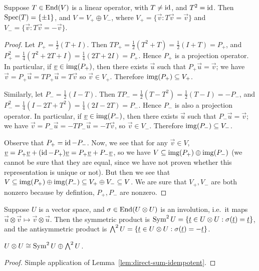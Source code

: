 \begin{lemma}\label{lem:direct-sum-idempotent}
    Suppose \(T \in \operatorname{End}(V)\) is a linear operator,
    with \(T \neq \operatorname{id}\), and \(T^2 = \operatorname{id}\).
    Then \(\operatorname{Spec}(T) = \{\pm 1\}\), and \(V = V_+ \oplus V_-\),
    where \(V_+ = \{\vec{v}: T\vec{v} = \vec{v}\}\)
    and \(V_- = \{\vec{v}: T\vec{v} = -\vec{v}\}\).
\end{lemma}
\begin{proof}
    Let \(P_+ = \frac{1}{2}(T+I)\).
    Then \(TP_+ = \frac{1}{2}(T^2+T) = \frac{1}{2}(I+T) = P_+\),
    and \(P_+^2 = \frac{1}{4}(T^2+2T+I) = \frac{1}{4}(2T+2I) = P_+\).
    Hence \(P_+\) is a projection operator.
    In particular, if \(\underline{v} \in \operatorname{img}(P_+)\),
    then there exists \(\vec{u}\) such that \(P_+\vec{u} = \vec{v}\);
    we have \(\vec{v} = P_+\vec{u} = TP_+\vec{u} = T\vec{v}\)
    so \(\vec{v} \in V_+\).
    Therefore \(\operatorname{img}(P_+) \subseteq V_+\).

    Similarly, let \(P_- = \frac{1}{2}(I-T)\).
    Then \(TP_- = \frac{1}{2}(T-T^2) = \frac{1}{2}(T-I) = -P_-\),
    and \(P_-^2 = \frac{1}{4}(I-2T+T^2) = \frac{1}{4}(2I-2T) = P_-\).
    Hence \(P_-\) is also a projection operator.
    In particular, if \(\underline{v} \in \operatorname{img}(P_-)\),
    then there exists \(\vec{u}\) such that \(P_-\vec{u} = \vec{v}\);
    we have \(\vec{v} = P_-\vec{u} = -TP_-\vec{u} = -T\vec{v}\),
    so \(\vec{v} \in V_-\).
    Therefore \(\operatorname{img}(P_-) \subseteq V_-\).

    Observe that \(P_+ = \operatorname{id} - P_-\).
    Now, we see that for any \(\vec{v} \in V\),
    \(\underline{v} = P_+\underline{v} + (\operatorname{id} - P_+)\underline{v} = P_+\underline{v} + P_-\underline{v}\),
    so we have \(V \subseteq \operatorname{img}(P_+) \oplus \operatorname{img}(P_-)\)
    (we cannot be sure that they are equal,
    since we have not proven whether this representation is unique or not).
    But then we see that
    \(V \subseteq \operatorname{img}(P_+) \oplus \operatorname{img}(P_-) \subseteq V_+ \oplus V_- \subseteq V\).
    We are sure that \(V_+,V_-\) are both nonzero
    because by defintion, \(P_+,P_-\) are nonzero.
\end{proof}
\begin{definition}
    Suppose \(U\) is a vector space,
    and \(\sigma \in \operatorname{End}(U \otimes U)\) is an involution,
    i.e.\ it maps \(\vec{u}\otimes\vec{v} \mapsto \vec{v}\otimes\vec{u}\).
    Then the symmetric product is
    \(\operatorname{Sym}^2 U = \{\underline{t} \in U \otimes U: \sigma(\underline{t}) = \underline{t}\}\),
    and the antisymmetric product is
    \(\operatorname{{\bigwedge}}^2 U = \{\underline{t} \in U \otimes U: \sigma(\underline{t}) = -\underline{t}\}\).
\end{definition}
\begin{proposition}\label{prop:sum-sym-wedge}
    \(U \otimes U \cong \operatorname{Sym}^2 U \oplus \operatorname{{\bigwedge}}^2 U\).
\end{proposition}
\begin{proof}
    Simple application of Lemma~\ref*{lem:direct-sum-idempotent}.
\end{proof}

